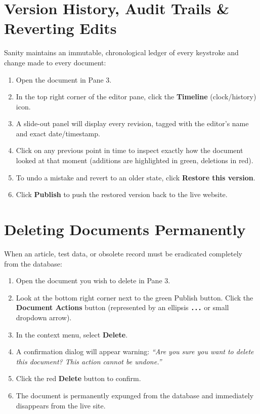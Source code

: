 \documentclass[11pt,a4paper,oneside]{book}
\begin{document}
\section{Version History, Audit Trails \& Reverting Edits}
Sanity maintains an immutable, chronological ledger of every keystroke and change made to every document:

\begin{enumerate}[leftmargin=*,label=\textbf{Step \arabic*:}]
  \item Open the document in Pane 3.
  \item In the top right corner of the editor pane, click the \textbf{Timeline} (clock/history) icon.
  \item A slide-out panel will display every revision, tagged with the editor's name and exact date/timestamp.
  \item Click on any previous point in time to inspect exactly how the document looked at that moment (additions are highlighted in green, deletions in red).
  \item To undo a mistake and revert to an older state, click \textbf{Restore this version}.
  \item Click \textbf{Publish} to push the restored version back to the live website.
\end{enumerate}

\section{Deleting Documents Permanently}
When an article, test data, or obsolete record must be eradicated completely from the database:

\begin{enumerate}[leftmargin=*,label=\textbf{Step \arabic*:}]
  \item Open the document you wish to delete in Pane 3.
  \item Look at the bottom right corner next to the green Publish button. Click the \textbf{Document Actions} button (represented by an ellipsis \textbf{\texttt{...}} or small dropdown arrow).
  \item In the context menu, select \textbf{Delete}.
  \item A confirmation dialog will appear warning: \textit{``Are you sure you want to delete this document? This action cannot be undone.''}
  \item Click the red \textbf{Delete} button to confirm.
  \item The document is permanently expunged from the database and immediately disappears from the live site.
\end{enumerate}
\end{document}
